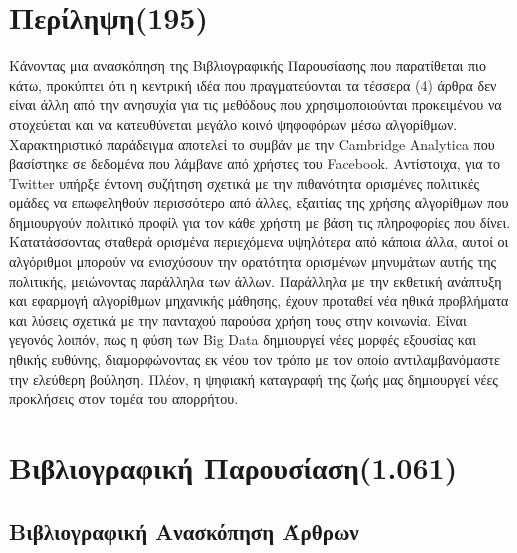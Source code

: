 \documentclass{report}
\begin{document}
\chapter{Περίληψη(195)}
Κάνοντας μια ανασκόπηση της Βιβλιογραφικής Παρουσίασης που παρατίθεται πιο κάτω, προκύπτει ότι η κεντρική ιδέα που πραγματεύονται τα τέσσερα (4) άρθρα δεν είναι άλλη από την ανησυχία για τις μεθόδους που χρησιμοποιούνται προκειμένου να στοχεύεται και να κατευθύνεται μεγάλο κοινό ψηφοφόρων μέσω αλγορίθμων. Χαρακτηριστικό παράδειγμα αποτελεί το συμβάν με την Cambridge Analytica
που βασίστηκε σε δεδομένα που λάμβανε από χρήστες του Facebook.
Αντίστοιχα, για το Twitter υπήρξε έντονη συζήτηση σχετικά με την πιθανότητα ορισμένες πολιτικές ομάδες  να επωφεληθούν περισσότερο από άλλες, εξαιτίας της χρήσης αλγορίθμων που δημιουργούν πολιτικό προφίλ για τον κάθε χρήστη με βάση τις πληροφορίες που δίνει.
Κατατάσσοντας σταθερά ορισμένα περιεχόμενα υψηλότερα από κάποια άλλα, αυτοί οι αλγόριθμοι μπορούν να ενισχύσουν την ορατότητα ορισμένων μηνυμάτων αυτής της πολιτικής, μειώνοντας παράλληλα των άλλων.
Παράλληλα με την εκθετική ανάπτυξη και εφαρμογή αλγορίθμων μηχανικής μάθησης, έχουν προταθεί νέα ηθικά προβλήματα και λύσεις σχετικά με την πανταχού παρούσα χρήση τους στην κοινωνία. 
Είναι γεγονός λοιπόν, πως η φύση των Big Data δημιουργεί νέες μορφές εξουσίας και ηθικής ευθύνης, διαμορφώνοντας εκ νέου τον τρόπο με τον οποίο αντιλαμβανόμαστε την ελεύθερη βούληση. Πλέον, η ψηφιακή καταγραφή της ζωής μας δημιουργεί νέες προκλήσεις στον  τομέα του απορρήτου. 


\chapter{Βιβλιογραφική Παρουσίαση(1.061)}

\section{Βιβλιογραφική Ανασκόπηση Άρθρων}
\end{document}
